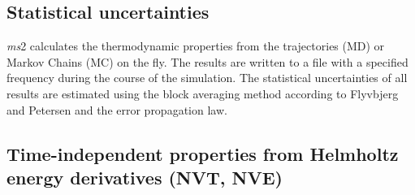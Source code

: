 \subsection{Statistical uncertainties}
\label{sec:Statun}

\textit{ms}2 calculates the thermodynamic properties from the trajectories (MD) or Markov Chains (MC) on the fly. The results are written to a file with a specified frequency during the course of the simulation. The statistical uncertainties of all results are estimated using the block averaging method according to Flyvbjerg and Petersen \parencite{flyvberg} and the error propagation law.

\subsection{Time-independent properties from Helmholtz energy derivatives (NVT, NVE)}
\label{sec:PropHelm}


